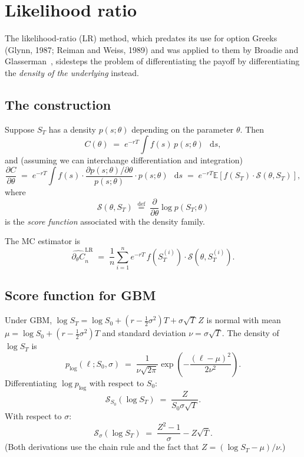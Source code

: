 \documentclass[11pt,a4paper]{article}
\theoremstyle{plain}
\theoremstyle{definition}
\theoremstyle{remark}
\newcommand{\E}{\mathbb{E}}
\newcommand{\dd}{\mathop{}\!\mathrm{d}}
\newcommand{\eqdef}{\overset{\mathrm{def}}{=}}
\begin{document}
\section{Likelihood ratio}
\label{sec:lr}

The likelihood-ratio (LR) method, which predates its use for option
Greeks (Glynn, 1987; Reiman and Weiss, 1989) and was applied to them
by Broadie and Glasserman~\cite{BroadieGlasserman1996}, sidesteps the
problem of differentiating the payoff by differentiating the
\emph{density of the underlying} instead.

\subsection{The construction}

Suppose $S_T$ has a density $p(s; \theta)$ depending on the parameter
$\theta$. Then
\begin{equation}
C(\theta) \;=\; e^{-rT} \int f(s)\, p(s; \theta)\, \dd s,
\end{equation}
and (assuming we can interchange differentiation and integration)
\begin{equation}
\frac{\partial C}{\partial\theta}
\;=\; e^{-rT} \int f(s) \cdot \frac{\partial p(s; \theta)/\partial\theta}{p(s; \theta)}
\cdot p(s; \theta)\, \dd s
\;=\; e^{-rT} \E\!\left[ f(S_T) \cdot \mathcal{S}(\theta, S_T) \right],
\end{equation}
where
\begin{equation}
\mathcal{S}(\theta, S_T)
\;\eqdef\; \frac{\partial}{\partial\theta} \log p(S_T; \theta)
\end{equation}
is the \emph{score function} associated with the density family.

The MC estimator is
\begin{equation}
\widehat{\partial_\theta C}_n^{\mathrm{LR}}
\;=\; \frac{1}{n} \sum_{i=1}^n e^{-rT}\, f(S_T^{(i)}) \cdot \mathcal{S}(\theta, S_T^{(i)}).
\end{equation}

\subsection{Score function for GBM}

Under GBM, $\log S_T = \log S_0 + (r - \frac{1}{2}\sigma^2)T +
\sigma\sqrt T \, Z$ is normal with mean $\mu = \log S_0 + (r -
\frac{1}{2}\sigma^2)T$ and standard deviation $\nu = \sigma\sqrt T$.
The density of $\log S_T$ is
\begin{equation}
p_{\log}(\ell; S_0, \sigma)
\;=\; \frac{1}{\nu \sqrt{2\pi}}
\exp\!\left(-\frac{(\ell - \mu)^2}{2\nu^2}\right).
\end{equation}
Differentiating $\log p_{\log}$ with respect to $S_0$:
\begin{equation}
\mathcal{S}_{S_0}(\log S_T) \;=\; \frac{Z}{S_0 \sigma \sqrt T}.
\end{equation}
With respect to $\sigma$:
\begin{equation}
\mathcal{S}_\sigma(\log S_T)
\;=\; \frac{Z^2 - 1}{\sigma} - Z \sqrt T.
\end{equation}
(Both derivations use the chain rule and the fact that $Z = (\log
S_T - \mu)/\nu$.)
\end{document}
